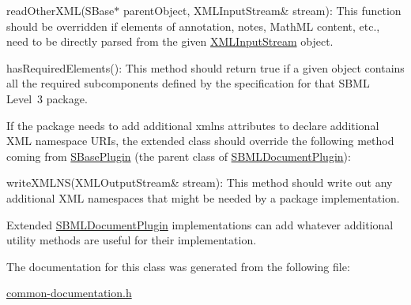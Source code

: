 \begin{DoxyItemize}
\item {\ttfamily read\+Other\+X\+M\+L(\+S\+Base$\ast$ parent\+Object, X\+M\+L\+Input\+Stream\& stream)}\+: This function should be overridden if elements of annotation, notes, Math\+ML content, etc., need to be directly parsed from the given \hyperlink{class_x_m_l_input_stream}{X\+M\+L\+Input\+Stream} object.\end{DoxyItemize}
\begin{DoxyItemize}
\item {\ttfamily has\+Required\+Elements()}\+: This method should return {\ttfamily true} if a given object contains all the required subcomponents defined by the specification for that S\+B\+ML Level~3 package.\end{DoxyItemize}


If the package needs to add additional {\ttfamily xmlns} attributes to declare additional X\+ML namespace U\+R\+Is, the extended class should override the following method coming from \hyperlink{class_s_base_plugin}{S\+Base\+Plugin} (the parent class of \hyperlink{class_s_b_m_l_document_plugin}{S\+B\+M\+L\+Document\+Plugin})\+:

\begin{DoxyItemize}
\item {\ttfamily write\+X\+M\+L\+N\+S(\+X\+M\+L\+Output\+Stream\& stream)}\+: This method should write out any additional X\+ML namespaces that might be needed by a package implementation.\end{DoxyItemize}


Extended \hyperlink{class_s_b_m_l_document_plugin}{S\+B\+M\+L\+Document\+Plugin} implementations can add whatever additional utility methods are useful for their implementation. 

The documentation for this class was generated from the following file\+:\begin{DoxyCompactItemize}
\item 
\hyperlink{common-documentation_8h}{common-\/documentation.\+h}\end{DoxyCompactItemize}
